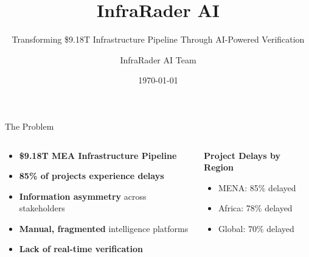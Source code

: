 \documentclass[aspectratio=169]{beamer}
\title{InfraRader AI}
\subtitle{Transforming \$9.18T Infrastructure Pipeline Through AI-Powered Verification}
\author{InfraRader AI Team}
\date{\today}
\begin{document}
\begin{frame}
    \titlepage
\end{frame}

\begin{frame}{The Problem}
    \begin{columns}
        \begin{column}{0.6\textwidth}
            \begin{itemize}
                \item \textbf{\$9.18T MEA Infrastructure Pipeline}
                \item \textbf{85\% of projects experience delays}
                \item \textbf{Information asymmetry} across stakeholders
                \item \textbf{Manual, fragmented} intelligence platforms
                \item \textbf{Lack of real-time verification}
            \end{itemize}
        \end{column}
        \begin{column}{0.4\textwidth}
            \begin{center}
                \textbf{Project Delays by Region}
                \vspace{0.5cm}
                \begin{itemize}
                    \item MENA: 85\% delayed
                    \item Africa: 78\% delayed
                    \item Global: 70\% delayed
                \end{itemize}
            \end{center}
        \end{column}
    \end{columns}
\end{frame}
\end{document}

